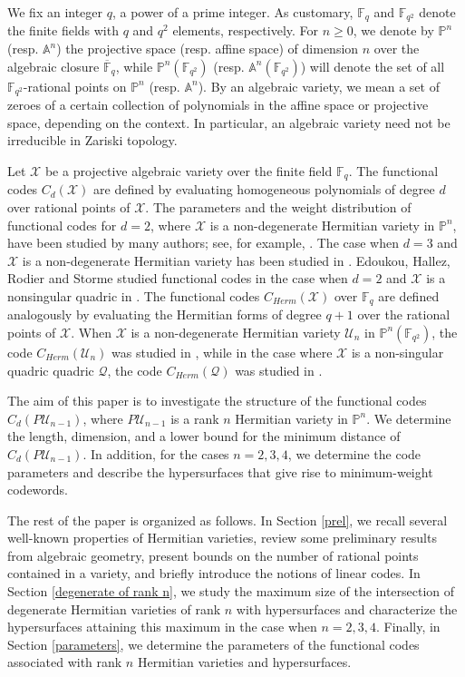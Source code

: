 \documentclass[10pt,a4paper,oneside]{amsproc}
\newcommand{\Fqt}{\mathbb{F}_{q^2}}
\newcommand{\Fq}{\mathbb{F}_q}
\newcommand{\U}{\mathcal{U}}
\def\Fq{{\mathbb F}_q}
\def\AA{{\mathbb A}}
\def\FF{{\mathbb F}}
\def\PP{{\mathbb P}}
\newcommand{\X}{\mathcal{X}}
\begin{document}
We fix an integer $q$, a power of a prime integer. As customary, $\Fq$ and $\Fqt$ denote the finite fields with $q$ and $q^2$ elements, respectively. For $n \ge 0$, we denote by $\PP^n$ (resp. $\AA^n$) the projective space (resp. affine space) of dimension $n$ over the algebraic closure $\overline{\FF}_q$, while $\PP^n (\Fqt)$ (resp. $\AA^n(\Fqt)$) will denote the set of all $\Fqt$-rational points on $\PP^n$ (resp. $\AA^n$). By an algebraic variety, we mean a set of zeroes of a certain collection of polynomials in the affine space or projective space, depending on the context. In particular, an algebraic variety need not be irreducible in Zariski topology.  


Let $\X$ be a projective algebraic variety over the finite field $\Fq$. The functional codes $C_d(\X)$ are defined by evaluating homogeneous polynomials of degree $d$ over rational points of $\X$. The parameters and the weight distribution of functional codes for $d = 2$, where $\mathcal{X}$ is a non-degenerate Hermitian variety in $\mathbb{P}^n$, have been studied by many authors; see, for example, \cite{BBFS, E, E1, E2, E3, ELX, HS}. The case when $d=3$ and $\X$ is a non-degenerate Hermitian variety has been studied in \cite{DM, S1}. Edoukou, Hallez, Rodier and Storme studied functional codes in the case when $d=2$ and $\X$ is a nonsingular quadric in \cite{EHRS1}. The functional codes $C_{Herm}(\X)$ over $\Fq$ are defined analogously by evaluating the Hermitian forms of degree $q+1$ over the rational points of $\X$. When $\X$ is a non-degenerate Hermitian variety $\U_n$ in $\PP^n(\Fqt)$, the code $C_{Herm}(\U_n)$ was studied in \cite{EHRS}, while in the case where $\X$ is a non-singular quadric quadric $\mathcal{Q}$, the code $C_{Herm}(\mathcal{Q})$ was studied in \cite{BBFS}.

The aim of this paper is to investigate the structure of the functional codes 
$C_d(P\U_{n-1})$, where $P\U_{n-1}$ is a rank $n$ Hermitian variety in $\PP^n$. 
We determine the length, dimension, and a lower bound for the minimum distance 
of $C_d(P\U_{n-1})$. In addition, for the cases $n=2, 3, 4$, we determine 
the code parameters and describe the hypersurfaces that give rise to 
minimum-weight codewords.


The rest of the paper is organized as follows. In Section \ref{prel}, we recall several well-known properties of Hermitian varieties, review some preliminary results from algebraic geometry, present bounds on the number of rational points contained in a variety, and briefly introduce the notions of linear codes. In Section \ref{degenerate of rank n}, we study the maximum size of the intersection of degenerate Hermitian varieties of rank $n$ with hypersurfaces and characterize the hypersurfaces attaining this maximum in the case when $n=2, 3,4$. Finally, in Section \ref{parameters}, we determine the parameters of the functional codes associated with rank $n$ Hermitian varieties and hypersurfaces.
\end{document}
